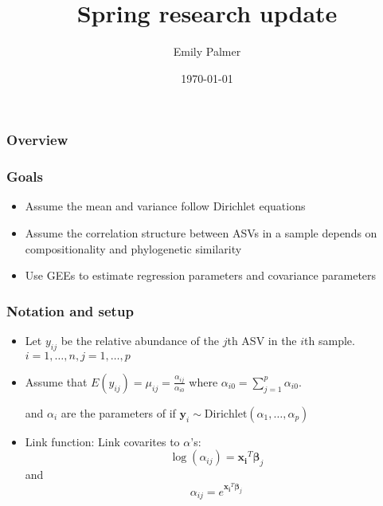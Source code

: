 \documentclass{beamer}
\title[Research Update]{Spring research update} %
\author{Emily Palmer} %
\institute[OSU] %
  {Oregon State University \\ %
    \medskip
    \textit{palmerem@oregonstate.edu} %
  }
\date{\today} %
\begin{document}
  \begin{frame}
  \titlepage %
  \end{frame}

  \begin{frame}
  \frametitle{Overview} %
  \tableofcontents %
  \end{frame}


\begin{frame}
\frametitle{Goals}
\begin{itemize}
  \item Assume the mean and variance follow Dirichlet equations
  \item Assume the correlation structure between ASVs in a sample depends on compositionality and phylogenetic similarity
  \item Use GEEs to estimate regression parameters and covariance parameters
\end{itemize}
\end{frame}

\begin{frame}
\frametitle{Notation and setup}
\begin{itemize}
  \item Let $y_{ij}$ be the relative abundance of the $j$th ASV in the $i$th sample. $i = 1, \ldots , n, j = 1, \ldots , p$
  \item Assume that $E(y_{ij})  = \mu_{ij} = \frac{\alpha_{ij}}{\alpha_{i0}}$
  where $\alpha_{i0} = \sum_{j = 1}^p \alpha_{i0}$.

  and $\alpha_i$ are the parameters of if
  $\mathbf{y}_i \sim \text{Dirichlet}(\alpha_1, \ldots , \alpha_p)$

  \item Link function: Link covarites to $\alpha$'s:
  $$\log(\alpha_{ij}) = \mathbf{x_i}^T\boldsymbol\beta_j$$
  and
  $$\alpha_{ij} = e^{\mathbf{x_i}^T\boldsymbol\beta_j}$$
\end{itemize}
\end{frame}
\end{document}
